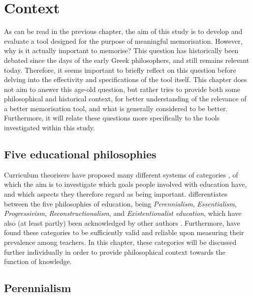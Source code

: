 \chapter{Context}

\label{ch:context}

As can be read in the previous chapter, the aim of this study is to develop and evaluate a tool designed for the purpose of meaningful memorisation. However, why is it actually important to memorise? This question has historically been debated since the days of the early Greek philosophers, and still remains relevant today. Therefore, it seems important to briefly reflect on this question before delving into the effectivity and specifications of the tool itself. This chapter does not aim to answer this age-old question, but rather tries to provide both some philosophical and historical context, for better understanding of the relevance of a better memorisation tool, and what is generally considered to be better. Furthermore, it will relate these questions more specifically to the tools investigated within this study.

\section{Five educational philosophies}

Curriculum theorisers have proposed many different systems of categories \cite{curriculumtheory}, of which the aim is to investigate which goals people involved with education have, and which aspects they therefore regard as being important.  differentiates between the five philosophies of education, being \emph{Perennialism}, \emph{Essentialism}, \emph{Progressivism}, \emph{Reconstructionalism}, and \emph{Existentionalist education}, which have also (at least partly) been acknowledged by other authors \cite{educationalphilosophy, educationalphilosophy2, educationalphilosophy3, educationalphilosophy4}. Furthermore,  have found these categories to be sufficiently valid and reliable upon measuring their prevalence among teachers. In this chapter, these categories will be discussed further individually in order to provide philosophical context towards the function of knowledge.

\section{Perennialism}

